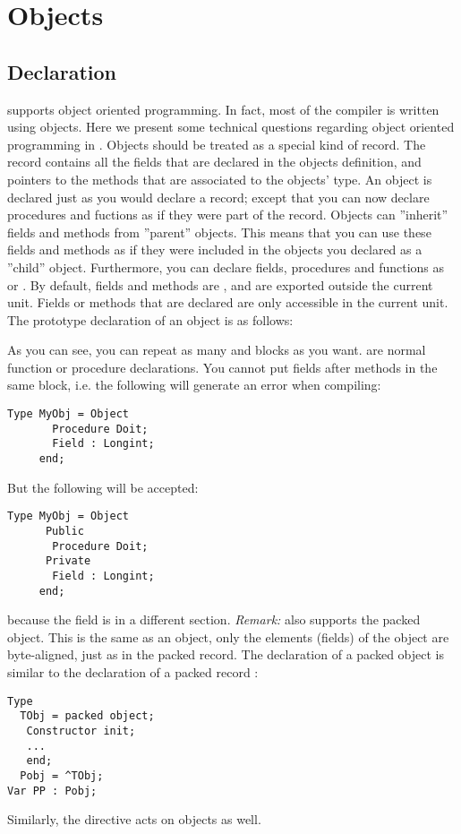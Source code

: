 \documentclass{report}
\begin{document}
\chapter{Objects}
\section{Declaration}
\fpc supports object oriented programming. In fact, most  of the compiler is
written using objects. Here we present some technical questions regarding
object oriented programming in \fpc.
Objects should be treated as a special kind of record. The record contains
all the fields that are declared in the objects definition, and pointers
to the methods that are associated to the objects' type.
An object is declared just as you would declare a record; except that you
can now declare procedures and fuctions as if they were part of the record.
Objects can ''inherit'' fields and methods from ''parent'' objects. This means
that you can use these fields and methods as if they were included in the
objects you declared as a ''child'' object.
Furthermore, you can declare fields, procedures and functions as 
or . By default, fields and methods are , and are
exported outside the current unit. Fields or methods that are declared
 are only accessible in the current unit.
The prototype declaration of an object is as follows:

As you can see, you can repeat as many  and 
blocks as you want.
 are normal function or procedure declarations.
You cannot put fields after methods in the same block, i.e. the following
will generate an error when compiling:
\begin{verbatim}
Type MyObj = Object
       Procedure Doit;
       Field : Longint;
     end;
\end{verbatim}
But the following will be accepted:
\begin{verbatim}
Type MyObj = Object
      Public
       Procedure Doit;
      Private
       Field : Longint;
     end;
\end{verbatim}
because the field is in a different section.
{\em Remark:}
\fpc also supports the packed object. This is the same as an object, only
the elements (fields) of the object are byte-aligned, just as in the packed
record.
The declaration of a packed object is similar to the declaration
of a packed record :
\begin{verbatim}
Type
  TObj = packed object;
   Constructor init;
   ...
   end;
  Pobj = ^TObj;
Var PP : Pobj;
\end{verbatim}
Similarly, the  directive acts on objects as well.
\end{document}
